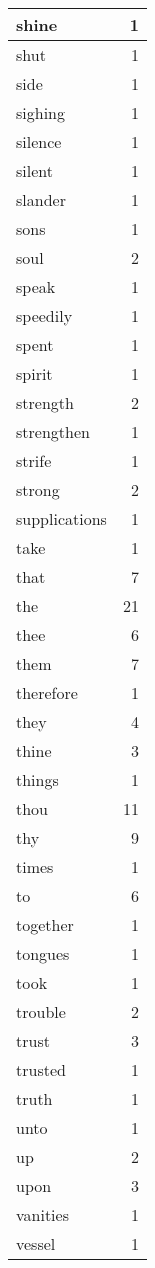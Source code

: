 \begin{center}
\begin{longtable}{l|r}
shine & 1 \\ \hline
shut & 1 \\ \hline
side & 1 \\ \hline
sighing & 1 \\ \hline
silence & 1 \\ \hline
silent & 1 \\ \hline
slander & 1 \\ \hline
sons & 1 \\ \hline
soul & 2 \\ \hline
speak & 1 \\ \hline
speedily & 1 \\ \hline
spent & 1 \\ \hline
spirit & 1 \\ \hline
strength & 2 \\ \hline
strengthen & 1 \\ \hline
strife & 1 \\ \hline
strong & 2 \\ \hline
supplications & 1 \\ \hline
take & 1 \\ \hline
that & 7 \\ \hline
the & 21 \\ \hline
thee & 6 \\ \hline
them & 7 \\ \hline
therefore & 1 \\ \hline
they & 4 \\ \hline
thine & 3 \\ \hline
things & 1 \\ \hline
thou & 11 \\ \hline
thy & 9 \\ \hline
times & 1 \\ \hline
to & 6 \\ \hline
together & 1 \\ \hline
tongues & 1 \\ \hline
took & 1 \\ \hline
trouble & 2 \\ \hline
trust & 3 \\ \hline
trusted & 1 \\ \hline
truth & 1 \\ \hline
unto & 1 \\ \hline
up & 2 \\ \hline
upon & 3 \\ \hline
vanities & 1 \\ \hline
vessel & 1 \\ \hline

\end{longtable}
\end{center}
